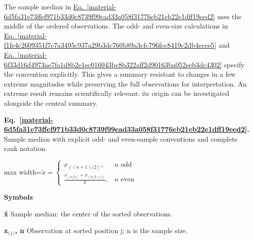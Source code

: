 \documentclass[11pt,a4paper]{article}
\begin{document}
\medskip

The sample median in \hyperref[material-6d5fa31e73ffef971b33d0c8739f99ead33a058f31776eb21eb22e1dff19eed2]{Eq.~\ref*{material-6d5fa31e73ffef971b33d0c8739f99ead33a058f31776eb21eb22e1dff19eed2}} uses the middle of the ordered observations. The odd- and even-size calculations in \hyperref[material-f1fe4c2609351f7c7a3495c937a29b3dc760b89a3cfc796fcc8419c2db4ecee5]{Eq.~\ref*{material-f1fe4c2609351f7c7a3495c937a29b3dc760b89a3cfc796fcc8419c2db4ecee5}} and \hyperref[material-6f33d16d4973ae7fa1d8b2e1ec016043bc8b322aff2d90163ba052eeb3dc4302]{Eq.~\ref*{material-6f33d16d4973ae7fa1d8b2e1ec016043bc8b322aff2d90163ba052eeb3dc4302}} specify the convention explicitly. This gives a summary resistant to changes in a few extreme magnitudes while preserving the full observations for interpretation. An extreme result remains scientifically relevant: its origin can be investigated alongside the central summary.


\par\medskip
\begin{samepage}
\label{material-6d5fa31e73ffef971b33d0c8739f99ead33a058f31776eb21eb22e1dff19eed2}
\noindent\textbf{Eq.~\ref*{material-6d5fa31e73ffef971b33d0c8739f99ead33a058f31776eb21eb22e1dff19eed2}.} Sample median with explicit odd- and even-sample conventions and complete rank notation.\par\nopagebreak
\begin{center}\begin{adjustbox}{max width=\linewidth}$\displaystyle \tilde{x}=\begin{cases}x_{((n+1)/2)}, & n\text{ odd}\\\frac{x_{(n/2)}+x_{(n/2+1)}}{2}, & n\text{ even}\end{cases}$\end{adjustbox}\end{center}

\par\noindent\textbf{Symbols}

\par\noindent\textbf{x̃} Sample median: the center of the sorted observations.

\par\noindent\textbf{x\ensuremath{{}_{(}}\ensuremath{{}_j}\ensuremath{{}_{)}}, n} Observation at sorted position j; n is the sample size.

\end{samepage}
\medskip
\end{document}
